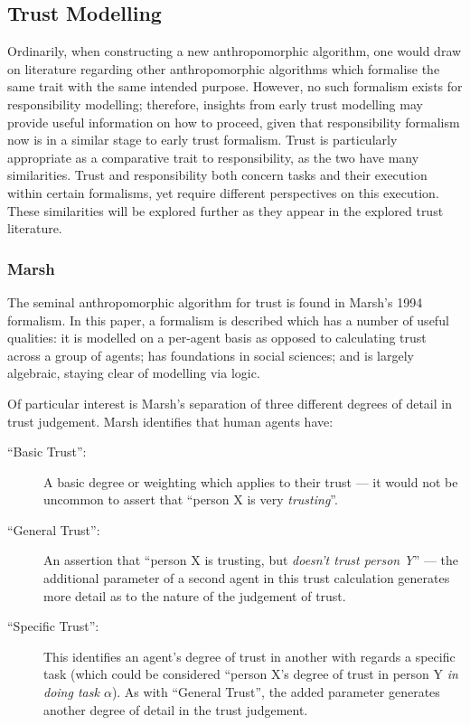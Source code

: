 \subsection{Trust Modelling}
Ordinarily, when constructing a new anthropomorphic algorithm, one would draw on literature regarding other anthropomorphic algorithms which formalise the same trait with the same intended purpose. However, no such formalism exists for responsibility modelling; therefore, insights from early trust modelling may provide useful information on how to proceed, given that responsibility formalism now is in a similar stage to early trust formalism. Trust is particularly appropriate as a comparative trait to responsibility, as the two have many similarities. Trust and responsibility both concern tasks and their execution within certain formalisms, yet require different perspectives on this execution. These similarities will be explored further as they appear in the explored trust literature.\par

\subsubsection{Marsh~\cite{Marsh1994FormalisingConcept}}
The seminal anthropomorphic algorithm for trust is found in Marsh's 1994 formalism\cite{Marsh1994FormalisingConcept}. In this paper, a formalism is described which has a number of useful qualities: it is modelled on a per-agent basis as opposed to calculating trust across a group of agents; has foundations in social sciences; and is largely algebraic, staying clear of modelling via logic.

Of particular interest is Marsh's separation of three different degrees of detail in trust judgement. Marsh identifies that human agents have:

\begin{description}
    \item [``Basic Trust'': ] A basic degree or weighting which applies to their trust --- it would not be uncommon to assert that ``person X is very \emph{trusting}''.
    \item [``General Trust'': ] An assertion that ``person X is trusting, but \emph{doesn't trust person Y}'' --- the additional parameter of a second agent in this trust calculation generates more detail as to the nature of the judgement of trust.
    \item [``Specific Trust'': ] This identifies an agent's degree of trust in another with regards a specific task (which could be considered ``person X's degree of trust in person Y \emph{in doing task \(\alpha\)}). As with ``General Trust'', the added parameter generates another degree of detail in the trust judgement.
\end{description}

